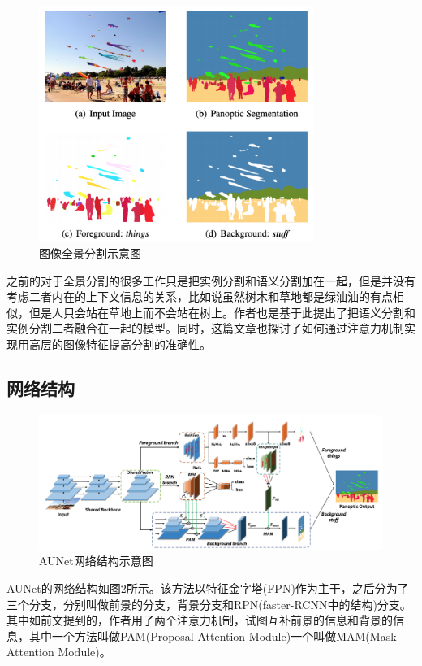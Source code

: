 \documentclass[cn]{elegantbook}
\begin{document}
\begin{figure}[h]
	\centering
	\includegraphics[width=0.8\textwidth]{images/paseg}
	\caption{\label{paseg}图像全景分割示意图}
\end{figure}

之前的对于全景分割的很多工作只是把实例分割和语义分割加在一起，但是并没有考虑二者内在的上下文信息的关系，比如说虽然树木和草地都是绿油油的有点相似，但是人只会站在草地上而不会站在树上。作者也是基于此提出了把语义分割和实例分割二者融合在一起的模型。同时，这篇文章也探讨了如何通过注意力机制实现用高层的图像特征提高分割的准确性。

\subsection{网络结构}

\begin{figure}[h]
	\centering
	\includegraphics[width=\textwidth]{images/aunet}
	\caption{\label{aunet}AUNet网络结构示意图}
\end{figure}

AUNet的网络结构如图\ref{aunet}所示。该方法以特征金字塔(FPN)作为主干，之后分为了三个分支，分别叫做前景的分支，背景分支和RPN(faster-RCNN中的结构)分支。其中如前文提到的，作者用了两个注意力机制，试图互补前景的信息和背景的信息，其中一个方法叫做PAM(Proposal Attention Module)一个叫做MAM(Mask Attention Module)。
\end{document}
